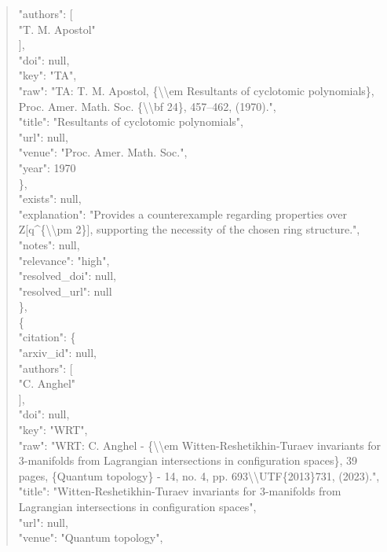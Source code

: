 \documentclass[11pt]{article}
\begin{document}
\begin{quote}
        "authors": [\\
          "T. M. Apostol"\\
        ],\\
        "doi": null,\\
        "key": "TA",\\
        "raw": "TA: T. M. Apostol, \{\textbackslash{}\textbackslash{}em Resultants of cyclotomic polynomials\}, Proc. Amer. Math. Soc. \{\textbackslash{}\textbackslash{}bf 24\}, 457--462, (1970).",\\
        "title": "Resultants of cyclotomic polynomials",\\
        "url": null,\\
        "venue": "Proc. Amer. Math. Soc.",\\
        "year": 1970\\
      \},\\
      "exists": null,\\
      "explanation": "Provides a counterexample regarding properties over Z[q\^{}\{\textbackslash{}\textbackslash{}pm 2\}], supporting the necessity of the chosen ring structure.",\\
      "notes": null,\\
      "relevance": "high",\\
      "resolved\_doi": null,\\
      "resolved\_url": null\\
    \},\\
    \{\\
      "citation": \{\\
        "arxiv\_id": null,\\
        "authors": [\\
          "C. Anghel"\\
        ],\\
        "doi": null,\\
        "key": "WRT",\\
        "raw": "WRT: C. Anghel - \{\textbackslash{}\textbackslash{}em Witten-Reshetikhin-Turaev invariants for 3-manifolds from Lagrangian intersections in configuration spaces\}, 39 pages, \{Quantum topology\} - 14, no. 4, pp. 693\textbackslash{}\textbackslash{}UTF\{2013\}731, (2023).",\\
        "title": "Witten-Reshetikhin-Turaev invariants for 3-manifolds from Lagrangian intersections in configuration spaces",\\
        "url": null,\\
        "venue": "Quantum topology",\\

\end{quote}
\end{document}
